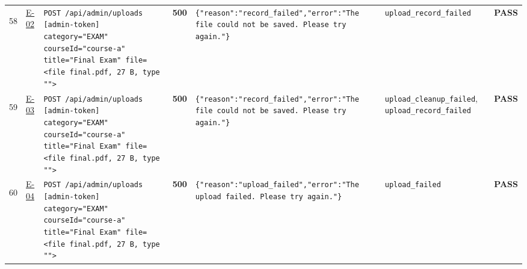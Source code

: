 \documentclass[10pt,a4paper]{article}
\begin{document}
\begin{landscape}
\begin{longtable}{@{}P{0.6cm}P{0.9cm}P{8.5cm}P{1.0cm}P{6.2cm}P{4.2cm}P{1.1cm}@{}}
\hypertarget{call58}{58} & \hyperlink{test-E-02}{E-02} & \texttt{POST /\allowbreak{}api/\allowbreak{}admin/\allowbreak{}uploads [admin-\allowbreak{}token] category=\allowbreak{}"\allowbreak{}EXAM"\allowbreak{} courseId=\allowbreak{}"\allowbreak{}course-\allowbreak{}a"\allowbreak{} title=\allowbreak{}"\allowbreak{}Final Exam"\allowbreak{} file=\allowbreak{}<file final.\allowbreak{}pdf,\allowbreak{} 27 B,\allowbreak{} type "\allowbreak{}"\allowbreak{}>} & \textcolor{failred}{\textbf{500}} & \texttt{\{"\allowbreak{}reason"\allowbreak{}:\allowbreak{}"\allowbreak{}record\_\allowbreak{}failed"\allowbreak{},\allowbreak{}"\allowbreak{}error"\allowbreak{}:\allowbreak{}"\allowbreak{}The file could not be saved.\allowbreak{} Please try again.\allowbreak{}"\allowbreak{}\}} & \texttt{upload\_\allowbreak{}record\_\allowbreak{}failed} & \textcolor{passgreen}{\textbf{PASS}} \\
\hypertarget{call59}{59} & \hyperlink{test-E-03}{E-03} & \texttt{POST /\allowbreak{}api/\allowbreak{}admin/\allowbreak{}uploads [admin-\allowbreak{}token] category=\allowbreak{}"\allowbreak{}EXAM"\allowbreak{} courseId=\allowbreak{}"\allowbreak{}course-\allowbreak{}a"\allowbreak{} title=\allowbreak{}"\allowbreak{}Final Exam"\allowbreak{} file=\allowbreak{}<file final.\allowbreak{}pdf,\allowbreak{} 27 B,\allowbreak{} type "\allowbreak{}"\allowbreak{}>} & \textcolor{failred}{\textbf{500}} & \texttt{\{"\allowbreak{}reason"\allowbreak{}:\allowbreak{}"\allowbreak{}record\_\allowbreak{}failed"\allowbreak{},\allowbreak{}"\allowbreak{}error"\allowbreak{}:\allowbreak{}"\allowbreak{}The file could not be saved.\allowbreak{} Please try again.\allowbreak{}"\allowbreak{}\}} & \texttt{upload\_\allowbreak{}cleanup\_\allowbreak{}failed}, \texttt{upload\_\allowbreak{}record\_\allowbreak{}failed} & \textcolor{passgreen}{\textbf{PASS}} \\
\hypertarget{call60}{60} & \hyperlink{test-E-04}{E-04} & \texttt{POST /\allowbreak{}api/\allowbreak{}admin/\allowbreak{}uploads [admin-\allowbreak{}token] category=\allowbreak{}"\allowbreak{}EXAM"\allowbreak{} courseId=\allowbreak{}"\allowbreak{}course-\allowbreak{}a"\allowbreak{} title=\allowbreak{}"\allowbreak{}Final Exam"\allowbreak{} file=\allowbreak{}<file final.\allowbreak{}pdf,\allowbreak{} 27 B,\allowbreak{} type "\allowbreak{}"\allowbreak{}>} & \textcolor{failred}{\textbf{500}} & \texttt{\{"\allowbreak{}reason"\allowbreak{}:\allowbreak{}"\allowbreak{}upload\_\allowbreak{}failed"\allowbreak{},\allowbreak{}"\allowbreak{}error"\allowbreak{}:\allowbreak{}"\allowbreak{}The upload failed.\allowbreak{} Please try again.\allowbreak{}"\allowbreak{}\}} & \texttt{upload\_\allowbreak{}failed} & \textcolor{passgreen}{\textbf{PASS}} \\

\end{longtable}
\end{landscape}
\end{document}
